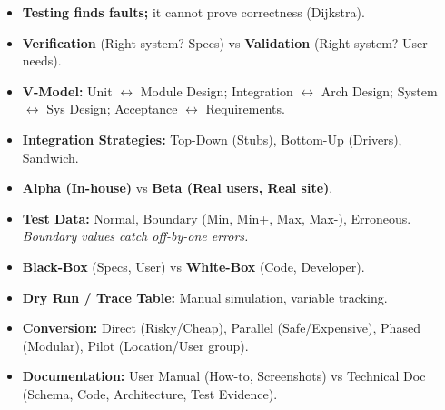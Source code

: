 \documentclass[11pt]{article}
\begin{document}
\begin{aretenir}
\begin{itemize}
    \item \textbf{Testing finds faults;} it cannot prove correctness (Dijkstra).
    \item \textbf{Verification} (Right system? Specs) vs \textbf{Validation} (Right system? User needs).
    \item \textbf{V-Model:} Unit $\leftrightarrow$ Module Design; Integration $\leftrightarrow$ Arch Design; System $\leftrightarrow$ Sys Design; Acceptance $\leftrightarrow$ Requirements.
    \item \textbf{Integration Strategies:} Top-Down (Stubs), Bottom-Up (Drivers), Sandwich.
    \item \textbf{Alpha (In-house)} vs \textbf{Beta (Real users, Real site)}.
    \item \textbf{Test Data:} Normal, Boundary (Min, Min+, Max, Max-), Erroneous. \emph{Boundary values catch off-by-one errors.}
    \item \textbf{Black-Box} (Specs, User) vs \textbf{White-Box} (Code, Developer).
    \item \textbf{Dry Run / Trace Table:} Manual simulation, variable tracking.
    \item \textbf{Conversion:} Direct (Risky/Cheap), Parallel (Safe/Expensive), Phased (Modular), Pilot (Location/User group).
    \item \textbf{Documentation:} User Manual (How-to, Screenshots) vs Technical Doc (Schema, Code, Architecture, Test Evidence).
\end{itemize}
\end{aretenir}
\end{document}
